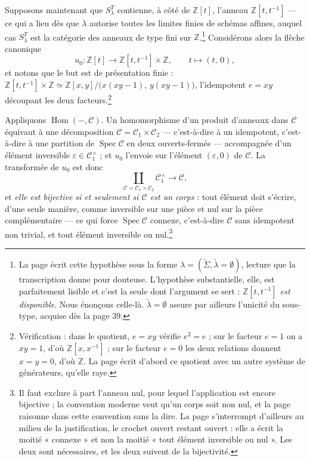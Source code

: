 \documentclass[11pt,a4paper]{article}
\begin{document}
Supposons maintenant que $S^{T}_{\lambda}$ contienne, à côté de
$\mathbb{Z}[t]$, l'anneau $\mathbb{Z}[t,t^{-1}]$ — ce qui a lieu dès que
$\lambda$ autorise toutes les limites finies de schémas affines, auquel cas
$S^{T}_{\lambda}$ est la catégorie des anneaux de type fini sur
$\mathbb{Z}$.\footnote{La page écrit cette hypothèse sous la forme
$\lambda = (\underleftarrow{\Sigma}, \underrightarrow{\lambda} = \emptyset)$,
lecture que la transcription donne pour douteuse. L'hypothèse substantielle,
elle, est parfaitement lisible et c'est la seule dont l'argument se sert :
\emph{$\mathbb{Z}[t,t^{-1}]$ est disponible}. Nous énonçons celle-là.
$\underrightarrow{\lambda} = \emptyset$ assure par ailleurs l'unicité du
sous-type, acquise dès la page 39.} Considérons alors la flèche canonique
\[
u_{0} : \mathbb{Z}[t] \longrightarrow \mathbb{Z}[t,t^{-1}] \times \mathbb{Z},
\qquad t \longmapsto (t,\,0),
\]
et notons que le but est de présentation finie :
$\mathbb{Z}[t,t^{-1}] \times \mathbb{Z} \simeq \mathbb{Z}[x,y] \big/
\bigl(x(xy-1),\, y(xy-1)\bigr)$, l'idempotent $e = xy$ découpant les deux
facteurs.\footnote{Vérification : dans le quotient, $e = xy$ vérifie
$e^{2} = e$ ; sur le facteur $e = 1$ on a $xy = 1$, d'où
$\mathbb{Z}[x,x^{-1}]$ ; sur le facteur $e = 0$ les deux relations donnent
$x = y = 0$, d'où $\mathbb{Z}$. La page écrit d'abord ce quotient avec un autre
système de générateurs, qu'elle raye.}

Appliquons $\operatorname{Hom}(-,\mathcal{C})$. Un homomorphisme d'un produit
d'anneaux dans $\mathcal{C}$ équivaut à une décomposition
$\mathcal{C} = \mathcal{C}_{1} \times \mathcal{C}_{2}$ — c'est-à-dire à un
idempotent, c'est-à-dire à une partition de $\operatorname{Spec}\mathcal{C}$ en
deux ouverts-fermés — accompagnée d'un élément inversible
$\varepsilon \in \mathcal{C}_{1}^{\times}$ ; et $u_{0}$ l'envoie sur l'élément
$(\varepsilon, 0)$ de $\mathcal{C}$. La transformée de $u_{0}$ est donc
\[
\coprod_{\mathcal{C} = \mathcal{C}_{1} \times \mathcal{C}_{2}}
\mathcal{C}_{1}^{\times} \longrightarrow \mathcal{C},
\]
et \emph{elle est bijective si et seulement si $\mathcal{C}$ est un corps} :
tout élément doit s'écrire, d'une seule manière, comme inversible sur une pièce
et nul sur la pièce complémentaire — ce qui force $\operatorname{Spec}
\mathcal{C}$ connexe, c'est-à-dire $\mathcal{C}$ sans idempotent non trivial, et
tout élément inversible ou nul.\footnote{Il faut exclure à part l'anneau nul,
pour lequel l'application est encore bijective ; la convention moderne veut
qu'un corps soit non nul, et la page raisonne dans cette convention sans la
dire. La page s'interrompt d'ailleurs au milieu de la justification, le crochet
ouvert restant ouvert : elle a écrit la moitié « connexe » et non la moitié
« tout élément inversible ou nul ». Les deux sont nécessaires, et les deux
suivent de la bijectivité.}
\end{document}
